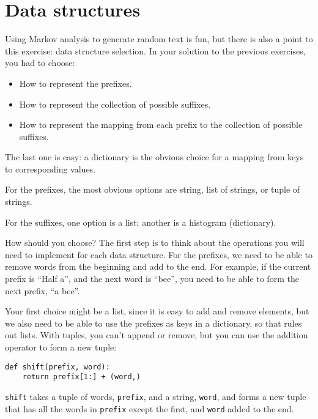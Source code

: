 \documentclass[10pt]{book}
\begin{document}
\section{Data structures}

Using Markov analysis to generate random text is fun, but there is
also a point to this exercise: data structure selection.  In your
solution to the previous exercises, you had to choose:

\begin{itemize}

\item How to represent the prefixes.

\item How to represent the collection of possible suffixes.

\item How to represent the mapping from each prefix to
the collection of possible suffixes.

\end{itemize}

The last one is easy: a dictionary is the obvious choice
for a mapping from keys to corresponding values.

For the prefixes, the most obvious options are string,
list of strings, or tuple of strings.

For the suffixes,
one option is a list; another is a histogram (dictionary).

How should you choose?  The first step is to think about
the operations you will need to implement for each data structure.
For the prefixes, we need to be able to remove words from
the beginning and add to the end.  For example, if the current
prefix is ``Half a'', and the next word is ``bee'', you need
to be able to form the next prefix, ``a bee''.

Your first choice might be a list, since it is easy to add
and remove elements, but we also need to be able to use the
prefixes as keys in a dictionary, so that rules out lists.
With tuples, you can't append or remove, but you can use
the addition operator to form a new tuple:

\begin{verbatim}
def shift(prefix, word):
    return prefix[1:] + (word,)
\end{verbatim}
%
{\tt shift} takes a tuple of words, {\tt prefix}, and a string, 
{\tt word}, and forms a new tuple that has all the words
in {\tt prefix} except the first, and {\tt word} added to
the end.
\end{document}
